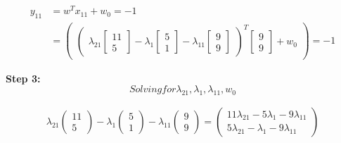 \documentclass[12pt]{report}
\begin{document}
\begin{equation*}
	\begin{aligned}
		y_{11} & =  w^T x_{11} + w_{0} = -1           \\
		       & = \begin{pmatrix}
			           \begin{pmatrix}
				\lambda_{21}\begin{bmatrix}
					            11 \\
					            5
				            \end{bmatrix} -

				\lambda_{1}\begin{bmatrix}
					           5 \\
					           1
				           \end{bmatrix} -

				\lambda_{11}\begin{bmatrix}
					            9 \\
					            9
				            \end{bmatrix}
			\end{pmatrix}  ^ T
			           \begin{bmatrix}
				9 \\
				9
			\end{bmatrix} + w_{0}
		           \end{pmatrix} = -1
	\end{aligned}
\end{equation*}

\vspace{20pt}

\textbf{Step 3:}
\begin{equation*}
	Solving for \lambda_{21}, \lambda_{1}, \lambda_{11}, w_{0}
\end{equation*}


\begin{equation*}
	\begin{aligned}
		\lambda_{21}\begin{pmatrix}11 \\ 5\end{pmatrix}-\lambda_{1}\begin{pmatrix}5\\ 1\end{pmatrix}-\lambda_{11}\begin{pmatrix}9\\ 9\end{pmatrix}=\begin{pmatrix}11\lambda_{21}-5\lambda_{1}-9\lambda_{11}\\ 5\lambda_{21}-\lambda_{1}-9\lambda_{11}\end{pmatrix}
	\end{aligned}
\end{equation*}
\end{document}
